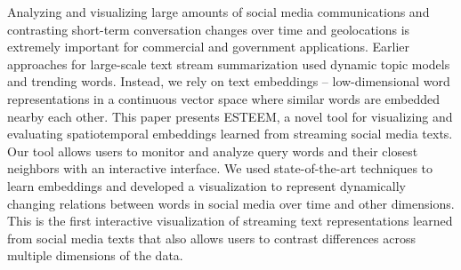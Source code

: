 Analyzing and visualizing large amounts of social media communications and contrasting short-term conversation changes over time and geolocations is extremely important for commercial and government applications. Earlier approaches for large-scale text stream summarization used dynamic topic models and trending words. Instead, we rely on text embeddings -- low-dimensional word representations in a continuous vector space where similar words are embedded nearby each other. This paper presents ESTEEM, a novel tool for visualizing and evaluating spatiotemporal embeddings learned from streaming social media texts. Our tool allows users to monitor and analyze query words and their closest neighbors with an interactive interface. We used state-of-the-art techniques to learn embeddings and developed a visualization to represent dynamically changing relations between words in social media over time and other dimensions. This is the first interactive visualization of streaming text representations learned from social media texts that also allows users to contrast differences across multiple dimensions of the data.
